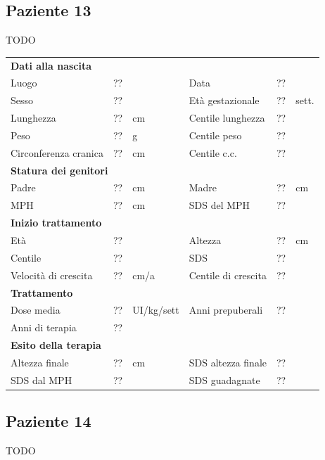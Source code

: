\subsection*{Paziente 13}

TODO

\begin{table}[!h]
\begin{tabular}{lrllrl}
\toprule
\multicolumn{6}{l}{\textbf{Dati alla nascita}}\\
Luogo 		& \multicolumn{2}{l}{??} 	& Data 					& \multicolumn{2}{l}{??} 	\\
Sesso 		& \multicolumn{2}{l}{??} 	& Età gestazionale 		& ?? 		& sett.\\
Lunghezza 	& ?? 		& cm 				& Centile lunghezza		& ?? 		\\
Peso 		& ?? 		& g					& Centile peso			& ?? 		\\
Circonferenza cranica	& ?? 		& cm 	& Centile c.c.			& ?? \\
\midrule
\multicolumn{6}{l}{\textbf{Statura dei genitori}}\\
Padre 		& ?? & cm 	& Madre 				& ?? & cm \\
MPH 		& ?? & cm 	& SDS del MPH 			& ??\\
\midrule
\multicolumn{6}{l}{\textbf{Inizio trattamento}} \\
Età	& ?? & 		& Altezza 				& ?? & cm  \\
Centile & ?? 	 &		& SDS		& ?? \\
Velocità di crescita & ?? & cm/a	& Centile di crescita & ??\\
\midrule
\multicolumn{6}{l}{\textbf{Trattamento}} \\
Dose media		& ?? & UI/kg/sett & Anni prepuberali & ??\\
Anni di terapia & ??\\
\midrule
\multicolumn{6}{l}{\textbf{Esito della terapia}} \\
Altezza finale			& ?? & cm 	& SDS altezza finale		& ??\\
SDS dal MPH				& ?? &		& SDS guadagnate 			& ??\\
\bottomrule
\end{tabular}
\end{table}
\clearpage


\subsection*{Paziente 14}

TODO

